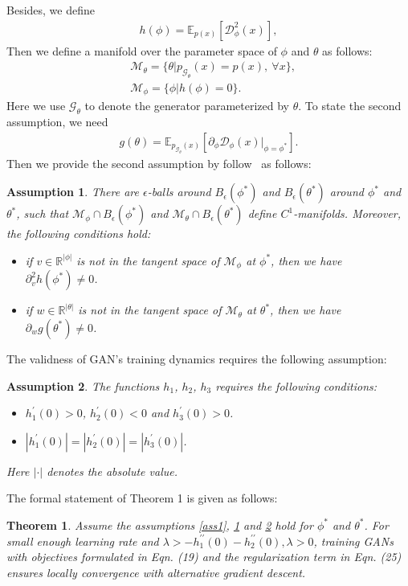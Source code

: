 \documentclass{article}
\newcommand{\ep}{\mathbb{E}}
\newcommand{\xG}{\mathcal{G}}
\newcommand{\xD}{\mathcal{D}}
\newcommand{\Real}{\mathbb{R}}
\newtheorem{assumption}{Assumption}
\newtheorem{theorem}{Theorem}
\theoremstyle{definition}
\begin{document}
Besides, we define 
\begin{align}
    h(\phi) = \ep_{p(x)}[\xD_\phi^2(x)],
\end{align}
Then we define a manifold over the parameter space of $\phi$ and $\theta$ as follows:
\begin{align}
    &\mathcal{M}_\theta = \{\theta| p_{\xG_{\theta}}(x) = p(x),~\forall x\},\\
    &\mathcal{M}_\phi = \{\phi| h(\phi) = 0\}.
\end{align}
Here we use $\xG_\theta$ to denote the generator parameterized by $\theta$. To state the second assumption, we need
\begin{align}
    g(\theta) = \ep_{p_{\xG_\theta}(x)}[\partial_\phi \xD_\phi(x)|_{\phi=\phi^*}].
\end{align}
Then we provide the second assumption by follow~\citet{mescheder2018training} as follows:
\begin{assumption}
There are $\epsilon$-balls around $B_\epsilon(\phi^*)$ and $B_\epsilon(\theta^*)$ around $\phi^*$ and $\theta^*$, such that $\mathcal{M}_\phi\cap B_\epsilon(\phi^*)$ and $\mathcal{M}_\theta\cap B_\epsilon(\theta^*)$ define $C^1$-manifolds. Moreover, the following conditions hold:
\begin{itemize}
    \item if $v\in \Real^{|\phi|}$ is not in the tangent space of $\mathcal{M}_\phi$ at $\phi^*$, then we have $\partial^2_v h(\phi^*) \neq 0$.
    \item if $w\in \Real^{|\theta|}$ is not in the tangent space of $\mathcal{M}_\theta$ at $\theta^*$, then we have $\partial_w g(\theta^*) \neq 0$.
\end{itemize}
\label{ass2}
\end{assumption}


The validness of GAN's training dynamics requires the following assumption:
\begin{assumption}
	The functions $h_1$, $h_2$, $h_3$ requires the following conditions:
	\begin{itemize}
		\item $h_1^\prime(0) > 0$, $h_2^\prime(0) < 0$ and $h_3^\prime(0) > 0$.
		\item $|h_1^\prime(0)| = |h_2^\prime(0)| = |h_3^\prime(0)|$.
	\end{itemize}
	Here $|\cdot|$ denotes the absolute value.
	\label{ass3}
\end{assumption}


The formal statement of Theorem 1 is given as follows:
\setcounter{theorem}{0}
\begin{theorem}
	Assume the assumptions \ref{ass1}, \ref{ass2} and \ref{ass3} hold for $\phi^*$ and $\theta^*$. For small enough learning rate and $\lambda>-h_1^{\prime\prime}(0)-h_2^{\prime\prime}(0), \lambda>0$, training GANs with objectives formulated in Eqn. (19) and the regularization term in Eqn. (25) ensures locally convergence with alternative gradient descent.
\end{theorem}
\end{document}
